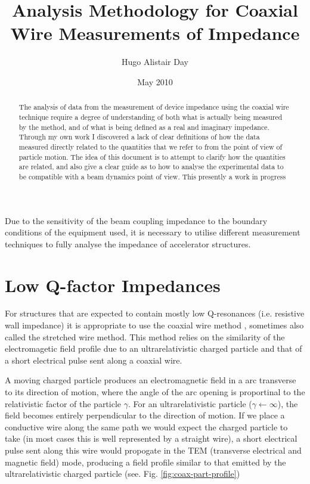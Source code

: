 \documentclass[12pt,a4paper,twopage,openright]{article}
\begin{document}
%
\title{Analysis Methodology for Coaxial Wire Measurements of Impedance}
\author{Hugo Alistair Day}
\date{May 2010}
\maketitle


\begin{abstract}
The analysis of data from the measurement of device impedance using the coaxial wire technique require a degree of understanding of both what is actually being measured by the method, and of what is being defined as a real and imaginary impedance. Through my own work I discovered a lack of clear definitions of how the data measured directly related to the quantities that we refer to from the point of view of particle motion. The idea of this document is to attempt to clarify how the quantities are related, and also give a clear guide as to how to analyse the experimental data to be compatible with a beam dynamics point of view. This presently a work in progress
\end{abstract}

\newpage

\tableofcontents

%



Due to the sensitivity of the beam coupling impedance to the boundary conditions of the equipment used, it is necessary to utilise different measurement techniques to fully analyse the impedance of accelerator structures.

\section{Low Q-factor Impedances}
\label{sec:coax_wire_meth}

For structures that are expected to contain mostly low Q-resonances (i.e. resistive wall impedance) it is appropriate to use the coaxial wire method \cite{Gluckstern:WireMeasImp, Vaccaro:ImprovedWireMeth}, sometimes also called the stretched wire method. This method relies on the similarity of the electromagetic field profile due to an ultrarelativistic charged particle and that of a short electrical pulse sent along a coaxial wire. 

A moving charged particle produces an electromagnetic field in a arc transverse to its direction of motion, where the angle of the arc opening is proportinal to the relativistic factor of the particle $\gamma$. For an ultrarelativistic particle ($\gamma \leftarrow \infty$), the field becomes entirely perpendicular to the direction of motion. If we place a conductive wire along the same path we would expect the charged particle to take (in most cases this is well represented by a straight wire), a short electrical pulse sent along this wire would propogate in the TEM (transverse electrical and magnetic field) mode, producing a field profile similar to that emitted by the ultrarelativistic charged particle (see. Fig. \ref{fig:coax-part-profile})
\end{document}
